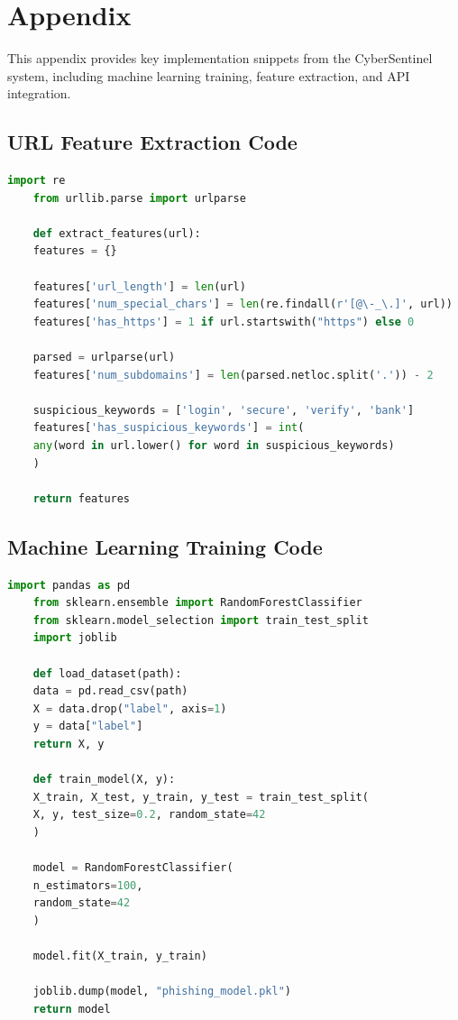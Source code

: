 
\appendix
\chapter{Appendix}

This appendix provides key implementation snippets from the CyberSentinel system, including machine learning training, feature extraction, and API integration.

\section{URL Feature Extraction Code}

\begin{lstlisting}[language=Python, caption=URL Feature Extraction for CyberSentinel, label=lst:feature_extraction]
	import re
	from urllib.parse import urlparse
	
	def extract_features(url):
	features = {}
	
	features['url_length'] = len(url)
	features['num_special_chars'] = len(re.findall(r'[@\-_\.]', url))
	features['has_https'] = 1 if url.startswith("https") else 0
	
	parsed = urlparse(url)
	features['num_subdomains'] = len(parsed.netloc.split('.')) - 2
	
	suspicious_keywords = ['login', 'secure', 'verify', 'bank']
	features['has_suspicious_keywords'] = int(
	any(word in url.lower() for word in suspicious_keywords)
	)
	
	return features
\end{lstlisting}

\section{Machine Learning Training Code}

\begin{lstlisting}[language=Python, caption=Random Forest Model Training for URL Classification, label=lst:ml_training]
	import pandas as pd
	from sklearn.ensemble import RandomForestClassifier
	from sklearn.model_selection import train_test_split
	import joblib
	
	def load_dataset(path):
	data = pd.read_csv(path)
	X = data.drop("label", axis=1)
	y = data["label"]
	return X, y
	
	def train_model(X, y):
	X_train, X_test, y_train, y_test = train_test_split(
	X, y, test_size=0.2, random_state=42
	)
	
	model = RandomForestClassifier(
	n_estimators=100,
	random_state=42
	)
	
	model.fit(X_train, y_train)
	
	joblib.dump(model, "phishing_model.pkl")
	return model
\end{lstlisting}

